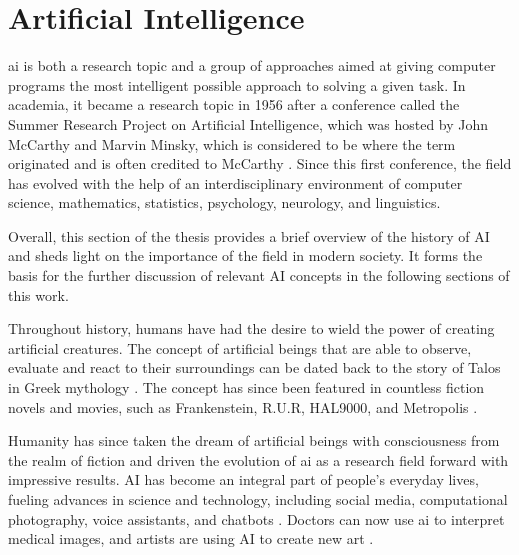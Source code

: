 \label{sec:2_background_theory}


\section{Artificial Intelligence}

\gls{ai} is both a research topic and a group of approaches aimed at giving computer programs the most intelligent possible approach to solving a given task. In academia, it became a research topic in 1956 after a conference called the Summer Research Project on Artificial Intelligence, which was hosted by John McCarthy and Marvin Minsky, which is considered to be where the term originated and is often credited to McCarthy \cite{mccarthyProposalDartmouthSummer2006, andresenJohnMcCarthyFather2002}. Since this first conference, the field has evolved with the help of an interdisciplinary environment of computer science, mathematics, statistics, psychology, neurology, and linguistics.

Overall, this section of the thesis provides a brief overview of the history of AI and sheds light on the importance of the field in modern society. It forms the basis for the further discussion of relevant AI concepts in the following sections of this work.

Throughout history, humans have had the desire to wield the power of creating artificial creatures. The concept of artificial beings that are able to observe, evaluate and react to their surroundings can be dated back to the story of Talos in Greek mythology \cite{universityAncientMythsReveal2019}. The concept has since been featured in countless fiction novels and movies, such as Frankenstein, R.U.R, HAL9000, and Metropolis \cite{shelleyFrankensteinModernPrometheus1992, capekRossumUniversalRobots, kubrick2001SpaceOdyssey1969, langMetropolis1927a}. 

Humanity has since taken the dream of artificial beings with consciousness from the realm of fiction and driven the evolution of \gls{ai} as a research field forward with impressive results. 
AI has become an integral part of people's everyday lives, fueling advances in science and technology, including social media, computational photography, voice assistants, and chatbots \cite{barbastathisUseDeepLearning, hoyAlexaSiriCortana2018, biswasRoleChatGPT2023}. Doctors can now use \gls{ai} to interpret medical images, and artists are using AI to create new art \cite{wangMachineLearningRadiology2012, thrallArtificialIntelligenceMachine2018}.


